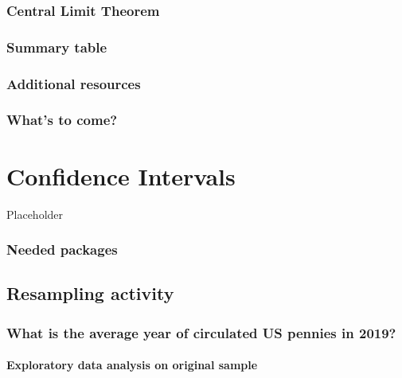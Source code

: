 \documentclass[12pt, krantz2,]{krantz}
\begin{document}
\hypertarget{sampling-conclusion-central-limit-theorem}{%
\subsection{Central Limit Theorem}\label{sampling-conclusion-central-limit-theorem}}

\hypertarget{sampling-conclusion-table}{%
\subsection{Summary table}\label{sampling-conclusion-table}}

\hypertarget{additional-resources-5}{%
\subsection{Additional resources}\label{additional-resources-5}}

\hypertarget{whats-to-come-6}{%
\subsection{What's to come?}\label{whats-to-come-6}}

\hypertarget{confidence-intervals}{%
\chapter{Confidence Intervals}\label{confidence-intervals}}

Placeholder

\hypertarget{needed-packages-6}{%
\subsection*{Needed packages}\label{needed-packages-6}}


\hypertarget{resampling-activity}{%
\section{Resampling activity}\label{resampling-activity}}

\hypertarget{what-is-the-average-year-of-circulated-us-pennies-in-2019}{%
\subsection{What is the average year of circulated US pennies in 2019?}\label{what-is-the-average-year-of-circulated-us-pennies-in-2019}}

\hypertarget{exploratory-data-analysis-on-original-sample}{%
\subsubsection*{Exploratory data analysis on original sample}\label{exploratory-data-analysis-on-original-sample}}
\end{document}
